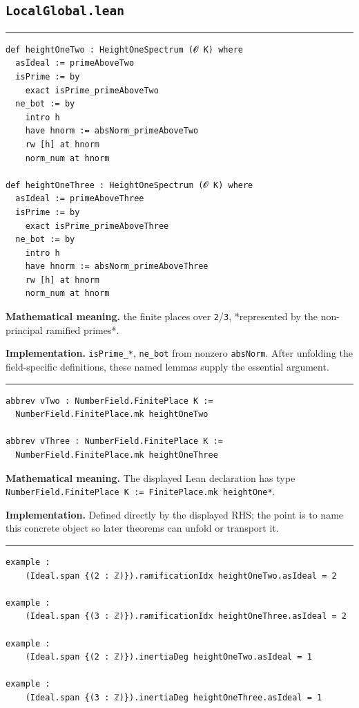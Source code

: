 \documentclass[UTF8,a4paper,11pt,fontset=fandol]{ctexart}
\theoremstyle{definition}
\newcommand{\statementsep}{\par\medskip\hrule\medskip}
\begin{document}
\subsection{\texttt{LocalGlobal.lean}}

\statementsep
\begin{verbatim}
def heightOneTwo : HeightOneSpectrum (𝓞 K) where
  asIdeal := primeAboveTwo
  isPrime := by
    exact isPrime_primeAboveTwo
  ne_bot := by
    intro h
    have hnorm := absNorm_primeAboveTwo
    rw [h] at hnorm
    norm_num at hnorm

def heightOneThree : HeightOneSpectrum (𝓞 K) where
  asIdeal := primeAboveThree
  isPrime := by
    exact isPrime_primeAboveThree
  ne_bot := by
    intro h
    have hnorm := absNorm_primeAboveThree
    rw [h] at hnorm
    norm_num at hnorm
\end{verbatim}
\noindent\textbf{Mathematical meaning.} the finite places over \texttt{2}/\texttt{3}, *represented by the non-principal ramified primes*.\par
\noindent\textbf{Implementation.} \texttt{isPrime\_\allowbreak{}*}, \texttt{ne\_\allowbreak{}bot} from nonzero \texttt{absNorm}. After unfolding the field-specific definitions, these named lemmas supply the essential argument.\par
\statementsep
\begin{verbatim}
abbrev vTwo : NumberField.FinitePlace K :=
  NumberField.FinitePlace.mk heightOneTwo

abbrev vThree : NumberField.FinitePlace K :=
  NumberField.FinitePlace.mk heightOneThree
\end{verbatim}
\noindent\textbf{Mathematical meaning.} The displayed Lean declaration has type \texttt{NumberField.\allowbreak{}FinitePlace K := FinitePlace.\allowbreak{}mk heightOne*}.\par
\noindent\textbf{Implementation.} Defined directly by the displayed RHS; the point is to name this concrete object so later theorems can unfold or transport it.\par
\statementsep
\begin{verbatim}
example :
    (Ideal.span {(2 : ℤ)}).ramificationIdx heightOneTwo.asIdeal = 2

example :
    (Ideal.span {(3 : ℤ)}).ramificationIdx heightOneThree.asIdeal = 2

example :
    (Ideal.span {(2 : ℤ)}).inertiaDeg heightOneTwo.asIdeal = 1

example :
    (Ideal.span {(3 : ℤ)}).inertiaDeg heightOneThree.asIdeal = 1
\end{verbatim}
\end{document}
